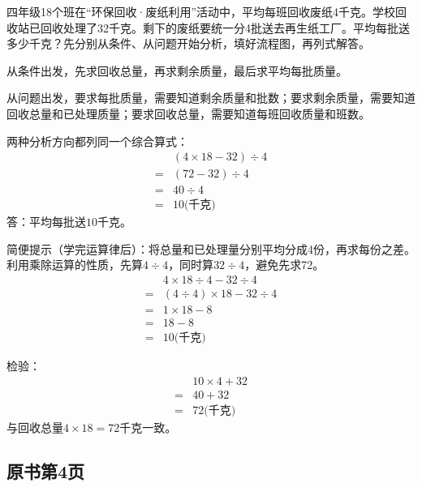 四年级18个班在“环保回收·废纸利用”活动中，平均每班回收废纸4千克。学校回收站已回收处理了32千克。剩下的废纸要统一分4批送去再生纸工厂。平均每批送多少千克？先分别从条件、从问题开始分析，填好流程图，再列式解答。\par
{}
\begin{BookAnswer}
从条件出发，先求回收总量，再求剩余质量，最后求平均每批质量。\par 从问题出发，要求每批质量，需要知道剩余质量和批数；要求剩余质量，需要知道回收总量和已处理质量；要求回收总量，需要知道每班回收质量和班数。\par 两种分析方向都列同一个综合算式：\[\begin{aligned}&(4\times18-32)\div4\\={}&(72-32)\div4\\={}&40\div4\\={}&10\text{(千克)}\end{aligned}\]答：平均每批送\(10\)千克。\par 简便提示（学完运算律后）：将总量和已处理量分别平均分成4份，再求每份之差。利用乘除运算的性质，先算\(4\div4\)，同时算\(32\div4\)，避免先求72。\[\begin{aligned}&4\times18\div4-32\div4\\={}&(4\div4)\times18-32\div4\\={}&1\times18-8\\={}&18-8\\={}&10\text{(千克)}\end{aligned}\]\par 检验：\[\begin{aligned}&10\times4+32\\={}&40+32\\={}&72\text{(千克)}\end{aligned}\]与回收总量\(4\times18=72\)千克一致。
\end{BookAnswer}



\subsection*{原书第4页}

